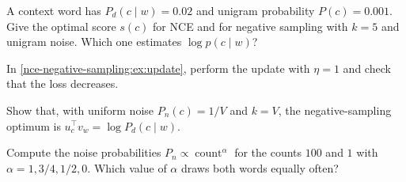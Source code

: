 \begin{notechapter}
\begin{exercise}\label{nce-negative-sampling:exr:2}
A context word has $P_d(c\mid w) = 0.02$ and unigram probability $P(c) = 0.001$. Give the optimal score $s(c)$ for NCE and for
negative sampling with $k = 5$ and unigram noise. Which one estimates $\log p(c\mid w)$?
\end{exercise}

\begin{exercise}\label{nce-negative-sampling:exr:3}
In \cref{nce-negative-sampling:ex:update}, perform the update with $\eta = 1$ and check that the loss decreases.
\end{exercise}

\begin{exercise}\label{nce-negative-sampling:exr:4}
Show that, with uniform noise $P_n(c) = 1/V$ and $k = V$, the negative-sampling optimum is $u_c^\top v_w = \log P_d(c\mid w)$.
\end{exercise}

\begin{exercise}\label{nce-negative-sampling:exr:5}
Compute the noise probabilities $P_n\propto\operatorname{count}^\alpha$ for the counts $100$ and $1$ with $\alpha = 1, 3/4, 1/2, 0$. Which value of $\alpha$
draws both words equally often?
\end{exercise}
\end{notechapter}
